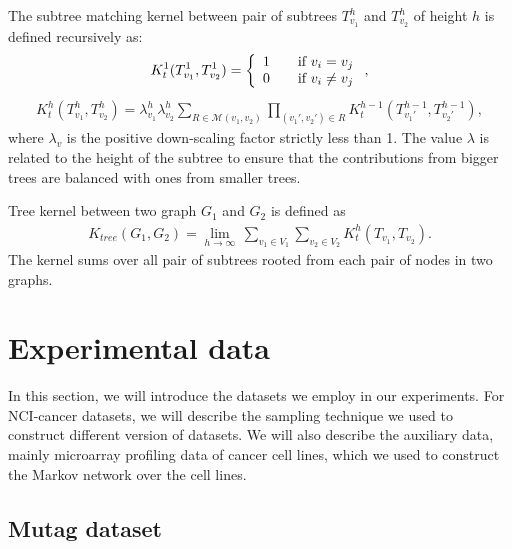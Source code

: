 \documentclass[english]{tktltiki}
\newcommand{\Mcal}{\mathcal{M}}
\begin{document}
The subtree matching kernel between pair of subtrees $T_{v_1}^h$ and $T_{v_2}^h$ of height $h$ is defined recursively as:
\begin{align*}
K_{t}^{1}(T_{v_1}^1,T_{v_2}^1) =
\left\{ 
\begin{array}{l l}
1 & \quad \text{if } v_i = v_j\\
0 & \quad \text{if } v_i \ne v_j\\
\end{array} \right.,
\end{align*}
\begin{align*}
K_{t}^{h}(T_{v_1}^h,T_{v_2}^h) = \lambda_{v_1}^h \lambda_{v_2}^h \sum_{R \in \Mcal(v_1,v_2)}\prod_{(v_1',v_2') \in R}{K_{t}^{h-1}(T_{v_1'}^{h-1},T_{v_2'}^{h-1})},
\end{align*}
where $\lambda_v$ is the positive down-scaling factor strictly less than 1. The value $\lambda$ is related to the height of the subtree to ensure that the contributions from bigger trees are balanced with ones from smaller trees.

Tree kernel between two graph $G_1$ and $G_2$ is defined as
\begin{align*}
K_{tree}(G_1,G_2) = \underset{h \to \infty}{\operatorname{lim}} \, \sum_{v_1 \in V_1}\sum_{v_2 \in V_2}K_{t}^h(T_{v_1},T_{v_2}).
\end{align*}
The kernel sums over all pair of subtrees rooted from each pair of nodes in two graphs. 






%
%
\clearpage
\section{Experimental data}

In this section, we will introduce the datasets we employ in our experiments. For NCI-cancer datasets, we will describe the sampling technique we used to construct different version of datasets. We will also describe the auxiliary data, mainly microarray profiling data of cancer cell lines, which we used to construct the Markov network over the cell lines.

\subsection{Mutag dataset}
\end{document}
